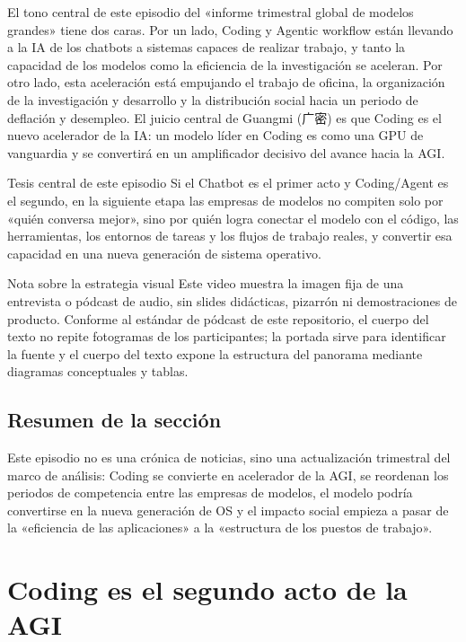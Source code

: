 \documentclass[a4paper]{article}
\begin{document}
El tono central de este episodio del «informe trimestral global de modelos grandes» tiene dos caras. Por un lado, Coding y Agentic workflow están llevando a la IA de los chatbots a sistemas capaces de realizar trabajo, y tanto la capacidad de los modelos como la eficiencia de la investigación se aceleran. Por otro lado, esta aceleración está empujando el trabajo de oficina, la organización de la investigación y desarrollo y la distribución social hacia un periodo de deflación y desempleo. El juicio central de Guangmi (广密) es que Coding es el nuevo acelerador de la IA: un modelo líder en Coding es como una GPU de vanguardia y se convertirá en un amplificador decisivo del avance hacia la AGI.

\begin{importantbox}{Tesis central de este episodio}
Si el Chatbot es el primer acto y Coding/Agent es el segundo, en la siguiente etapa las empresas de modelos no compiten solo por «quién conversa mejor», sino por quién logra conectar el modelo con el código, las herramientas, los entornos de tareas y los flujos de trabajo reales, y convertir esa capacidad en una nueva generación de sistema operativo.
\end{importantbox}

\begin{knowledgebox}{Nota sobre la estrategia visual}
Este video muestra la imagen fija de una entrevista o pódcast de audio, sin slides didácticas, pizarrón ni demostraciones de producto. Conforme al estándar de pódcast de este repositorio, el cuerpo del texto no repite fotogramas de los participantes; la portada sirve para identificar la fuente y el cuerpo del texto expone la estructura del panorama mediante diagramas conceptuales y tablas.
\end{knowledgebox}

\subsection{Resumen de la sección}

Este episodio no es una crónica de noticias, sino una actualización trimestral del marco de análisis: Coding se convierte en acelerador de la AGI, se reordenan los periodos de competencia entre las empresas de modelos, el modelo podría convertirse en la nueva generación de OS y el impacto social empieza a pasar de la «eficiencia de las aplicaciones» a la «estructura de los puestos de trabajo».
\section{Coding es el segundo acto de la AGI}
\end{document}
